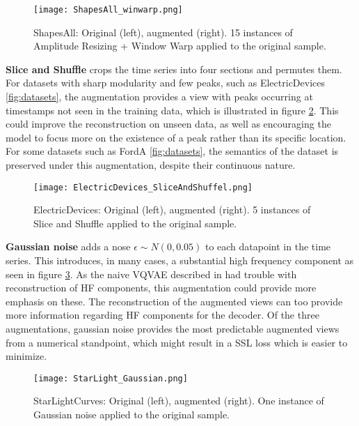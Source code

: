 \documentclass[../../thesis.tex]{subfiles}
\begin{document}
\begin{figure}[h]
    \label{fig:ShapesAll_winwarp}
    \texttt{[image: ShapesAll\_winwarp.png]}
    \centering
    \caption{ShapesAll: Original (left), augmented (right). 15 instances of Amplitude Resizing + Window Warp applied to the original sample.}
\end{figure}

\textbf{Slice and Shuffle} crops the time series into four sections and permutes them. For datasets with sharp modularity and few peaks, such as ElectricDevices \ref{fig:datasets}, the augmentation provides a view with peaks occurring at timestamps not seen in the training data, which is illustrated in figure \ref{fig:ElectricDevices_SliceAndShuffel}. This could improve the reconstruction on unseen data, as well as encouraging the model to focus more on the existence of a peak rather than its specific location. For some datasets such as FordA \ref{fig:datasets}, the semantics of the dataset is preserved under this augmentation, despite their continuous nature.\newline
\begin{figure}[h]
    \label{fig:ElectricDevices_SliceAndShuffel}
    \texttt{[image: ElectricDevices\_SliceAndShuffel.png]}
    \centering
    \caption{ElectricDevices: Original (left), augmented (right). 5 instances of Slice and Shuffle applied to the original sample.}
\end{figure}


\textbf{Gaussian noise} adds a nose $\epsilon \sim N(0,0.05)$ to each datapoint in the time series. This introduces, in many cases, a substantial high frequency component as seen in figure \ref{fig:StarLight_Gaussian}. As the naive VQVAE described in \cite{TimeVQVAE} had trouble with reconstruction of HF components, this augmentation could provide more emphasis on these. The reconstruction of the augmented views can too provide more information regarding HF components for the decoder. Of the three augmentations, gaussian noise provides the most predictable augmented views from a numerical standpoint, which might result in a SSL loss which is easier to minimize.

\begin{figure}[h]
    \label{fig:StarLight_Gaussian}
    \texttt{[image: StarLight\_Gaussian.png]}
    \centering
    \caption{StarLightCurves: Original (left), augmented (right). One instance of Gaussian noise applied to the original sample.}
\end{figure}
\end{document}
